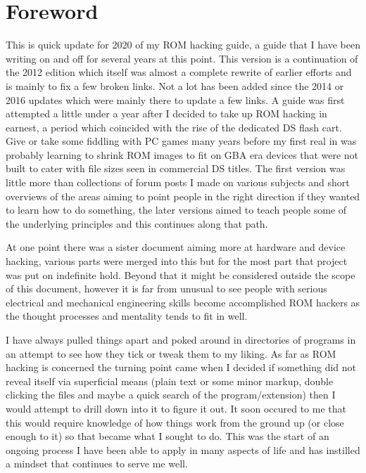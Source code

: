 \documentclass[
]{book}
\begin{document}
\hypertarget{foreword}{%
\chapter*{Foreword}\label{foreword}}

This is quick update for 2020 of my ROM hacking guide, a guide that I have been writing on and off for several years at this point. This version is a continuation of the 2012 edition which itself was almost a complete rewrite of earlier efforts and is mainly to fix a few broken links. Not a lot has been added since the 2014 or 2016 updates which were mainly there to update a few links. A guide was first attempted a little under a year after I decided to take up ROM hacking in earnest, a period which coincided with the rise of the dedicated DS flash cart. Give or take some fiddling with PC games many years before my first real in was probably learning to shrink ROM images to fit on GBA era devices that were not built to cater with file sizes seen in commercial DS titles. The first version was little more than collections of forum posts I made on various subjects and short overviews of the areas aiming to point people in the right direction if they wanted to learn how to do something, the later versions aimed to teach people some of the underlying principles and this continues along that path.

At one point there was a sister document aiming more at hardware and device hacking, various parts were merged into this but for the most part that project was put on indefinite hold. Beyond that it might be considered outside the scope of this document, however it is far from unusual to see people with serious electrical and mechanical engineering skills become accomplished ROM hackers as the thought processes and mentality tends to fit in well.

I have always pulled things apart and poked around in directories of programs in an attempt to see how they tick or tweak them to my liking. As far as ROM hacking is concerned the turning point came when I decided if something did not reveal itself via superficial means (plain text or some minor markup, double clicking the files and maybe a quick search of the program/extension) then I would attempt to drill down into it to figure it out. It soon occured to me that this would require knowledge of how things work from the ground up (or close enough to it) so that became what I sought to do. This was the start of an ongoing process I have been able to apply in many aspects of life and has instilled a mindset that continues to serve me well.
\end{document}
